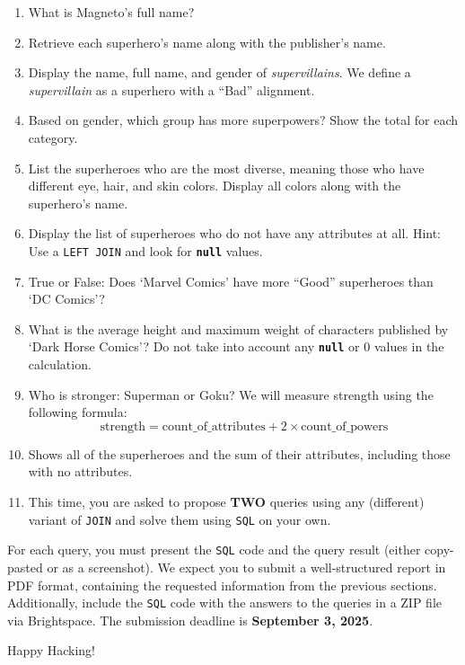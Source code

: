 \documentclass{article}
\begin{document}
\begin{enumerate}
  \item What is Magneto's full name?
  \item Retrieve each superhero’s name along with the publisher’s name.
  \item Display the name, full name, and gender of \textit{supervillains}. We define a \textit{supervillain} as a superhero with a ``Bad'' alignment.
  \item Based on gender, which group has more superpowers? Show the total for each category.
  \item List the superheroes who are the most diverse, meaning those who have different eye, hair, and skin colors. Display all colors along with the superhero's name.
  \item Display the list of superheroes who do not have any attributes at all. Hint: Use a \texttt{LEFT JOIN} and look for \texttt{\textbf{null}} values.
  \item True or False: Does `Marvel Comics' have more ``Good'' superheroes than `DC Comics'?
  \item What is the average height and maximum weight of characters published by `Dark Horse Comics'? Do not take into account any \texttt{\textbf{null}} or $0$ values in the calculation.
  \item Who is stronger: Superman or Goku? We will measure strength using the following formula:
  $$
    \text{strength} = \text{count\_of\_attributes} + 2 \times \text{count\_of\_powers}
  $$
  \item Shows all of the superheroes and the sum of their attributes, including those with no attributes.
  \item This time, you are asked to propose \textbf{TWO} queries using any (different) variant of \texttt{JOIN} and solve them using \texttt{SQL} on your own.
\end{enumerate}

For each query, you must present the \texttt{SQL} code and the query result (either copy-pasted or as a screenshot). We expect you to submit a well-structured report in PDF format, containing the requested information from the previous sections. Additionally, include the \texttt{SQL} code with the answers to the queries in a ZIP file via Brightspace. The submission deadline is \textbf{September 3, 2025}.

\vspace{5mm}
Happy Hacking! 
\end{document}
